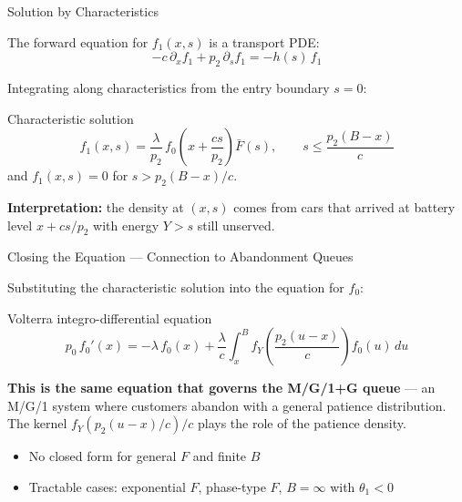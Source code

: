 \documentclass[aspectratio=169]{beamer}
\begin{document}
\begin{frame}{Solution by Characteristics}

  The forward equation for $f_1(x,s)$ is a transport PDE:
  \[
    -c\,\partial_x f_1 + p_2\,\partial_s f_1 = -h(s)\,f_1
  \]

  \medskip
  Integrating along characteristics from the entry boundary $s=0$:

  \begin{block}{Characteristic solution}
    \[
      f_1(x,s) = \frac{\lambda}{p_2}\,f_0\!\left(x+\frac{cs}{p_2}\right)\bar{F}(s),
      \qquad s \leq \frac{p_2(B-x)}{c}
    \]
    and $f_1(x,s) = 0$ for $s > p_2(B-x)/c$.
  \end{block}

  \medskip
  \textbf{Interpretation:} the density at $(x,s)$ comes from cars that arrived at battery level $x + cs/p_2$ with energy $Y > s$ still unserved.

\end{frame}

\begin{frame}{Closing the Equation — Connection to Abandonment Queues}

  Substituting the characteristic solution into the equation for $f_0$:

  \begin{block}{Volterra integro-differential equation}
    \[
      p_0\,f_0'(x) = -\lambda\,f_0(x)
        + \frac{\lambda}{c}\int_x^B f_Y\!\left(\frac{p_2(u-x)}{c}\right)f_0(u)\,du
    \]
  \end{block}

  \bigskip
  \textbf{This is the same equation that governs the M/G/1+G queue} — an M/G/1 system where customers abandon with a general patience distribution. The kernel $f_Y(p_2(u-x)/c)/c$ plays the role of the patience density.

  \bigskip
  \begin{itemize}
    \item No closed form for general $F$ and finite $B$
    \item Tractable cases: exponential $F$, phase-type $F$, $B=\infty$ with $\theta_1<0$
  \end{itemize}

\end{frame}
\end{document}
